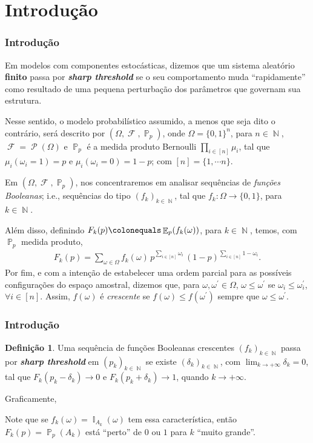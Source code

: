 \documentclass[9pt]{beamer}
\theoremstyle{definition} %
\newtheorem{mydef}{Definição}
\DeclareMathOperator{\PX}{\mathbb{P}} %
\DeclareMathOperator{\EX}{\mathbb{E}} %
\DeclareMathOperator{\FX}{\mathcal{F}} %
\DeclareMathOperator{\NX}{\mathbb{N}} %
\DeclareMathOperator{\IX}{\mathbb{I}} %
\DeclareMathOperator{\PL}{\mathcal{P}} %
\begin{document}
	\section{Introdução}
	\begin{frame}[t]
		\frametitle{Introdução}	
		Em modelos com componentes estocásticas, dizemos que um sistema aleatório \textbf{finito} passa por \textbf{\emph{sharp threshold}} se o seu comportamento muda ``rapidamente'' como resultado de uma pequena perturbação dos parâmetros que governam sua estrutura.
		\pause
		
		Nesse sentido, o modelo probabilístico assumido, a menos que seja dito o contrário, será descrito
		por $(\Omega, \FX, \PX_p)$, onde $\Omega = \{0,1\}^n$, para $n \in \NX$, $\FX = \PL(\Omega)$ e $\PX_p$ é a medida produto Bernoulli $\prod_{i \in [n]} \mu_i$, tal que $\mu_i(\omega_i = 1) = p$ e $\mu_i(\omega_i = 0) = 1-p$; com $[n] = \{1, \cdots n\}$.
		\pause
		
		Em $(\Omega, \FX, \PX_p)$, nos concentraremos em analisar sequências de \textit{funções Booleanas}; i.e., sequências do tipo $(f_k)_{k \in \NX}$, tal que $f_k: \Omega \to \{0, 1\}$, para $k \in \NX$.
		
		Além disso, definindo $F_k(p) \colonequals \EX_p(f_k(\omega))$, para $k \in \NX$, temos, com $\PX_p$ medida produto,
		\vspace{-6pt}
		\begin{align}\label{eq-sharp-threshold}
			F_k(p) = \sum_{\omega \in \Omega} f_k(\omega) \, p^{\sum_{i \in [n]} \omega_i} \, (1 - p)^{\sum_{i \in [n]} 1 - \omega_i}.
		\end{align}
		\pause
		Por fim, e com a intenção de estabelecer uma ordem parcial para as possíveis configurações do espaço amostral, dizemos que, para $\omega, \omega^{\prime} \in \Omega$, $\omega \leq \omega^{\prime}$ se $\omega_i \leq \omega_i^{\prime}$, $\forall i \in [n]$. Assim, $f(\omega)$ é \textit{crescente} se $f(\omega) \leq f(\omega^{\prime})$ sempre que $\omega \leq \omega^{\prime}$.
	\end{frame}

	\begin{frame}[t]
		\frametitle{Introdução}	
		\begin{mydef}
			Uma sequência de funções Booleanas crescentes $(f_k)_{k \in \NX}$ passa por \textit{\textbf{sharp threshold}} em $(p_k)_{k \in \NX}$ se existe $(\delta_k)_{k \in \NX}$, com $\lim_{k \rightarrow +\infty} \delta_k = 0$, tal que $F_k(p_k - \delta_k) \longrightarrow 0$ e $F_k(p_k + \delta_k) \longrightarrow 1$, quando $k \rightarrow +\infty$.
		\end{mydef}
		\pause
		Graficamente,
		\vspace{-9pt}
		
		\vspace{-18pt}
		Note que se $f_k(\omega) = \IX_{A_k}(\omega)$ tem essa característica, então $F_k(p) = \PX_p(A_k)$ está ``perto'' de $0$ ou $1$ para $k$ ``muito grande''.
	\end{frame}
\end{document}
